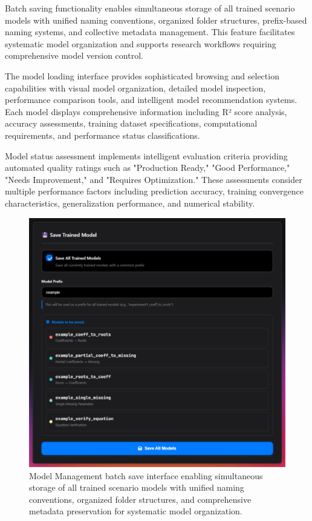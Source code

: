 \documentclass[11pt,a4paper]{report}
\begin{document}
Batch saving functionality enables simultaneous storage of all trained scenario models with unified naming conventions, organized folder structures, prefix-based naming systems, and collective metadata management. This feature facilitates systematic model organization and supports research workflows requiring comprehensive model version control.

The model loading interface provides sophisticated browsing and selection capabilities with visual model organization, detailed model inspection, performance comparison tools, and intelligent model recommendation systems. Each model displays comprehensive information including R² score analysis, accuracy assessments, training dataset specifications, computational requirements, and performance status classifications.

Model status assessment implements intelligent evaluation criteria providing automated quality ratings such as "Production Ready," "Good Performance," "Needs Improvement," and "Requires Optimization." These assessments consider multiple performance factors including prediction accuracy, training convergence characteristics, generalization performance, and numerical stability.

\begin{figure}[H]
\centering
\includegraphics[width=\textwidth]{quadratic_predictor_model_save.png}
\caption{Model Management batch save interface enabling simultaneous storage of all trained scenario models with unified naming conventions, organized folder structures, and comprehensive metadata preservation for systematic model organization.}
\label{fig:quadratic_model_save}
\end{figure}
\end{document}
